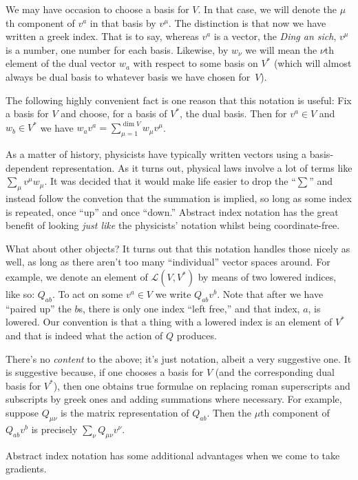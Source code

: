 \documentclass[10pt, a4paper]{article}
\begin{document}
We may have occasion to choose a basis for $V$. In that case, we will
denote the $\mu$th component of $v^a$ in that basis by $v^\mu$. The
distinction is that now we have written a greek index. That is to say,
whereas $v^a$ is a vector, the \emph{Ding an sich}, $v^\mu$ is a number,
one number for each basis. Likewise, by $w_\nu$ we will mean the
$\nu$th element of the dual vector $w_a$ with respect to some basis
on $V^*$ (which will almost always be dual basis to whatever basis we
have chosen for~$V$).

The following highly convenient fact is one reason that this notation
is useful: Fix a basis for $V$ and choose, for a basis of $V^*$, the
dual basis. Then for $v^a\in V$ and $w_b\in V^*$ we have
$w_av^a = \sum_{\mu=1}^{\dim V} w_\mu v^\mu$.

As a matter of history, physicists have typically written vectors
using a basis-dependent representation. As it turns out, physical laws
involve a lot of terms like $\sum_\mu v^\mu w_\mu$. It was decided that it
would make life easier to drop the “$\sum$” and instead follow the
convetion that the summation is implied, so long as some index is
repeated, once “up” and once “down.” Abstract index notation has the
great benefit of looking \emph{just like} the physicists' notation
whilst being coordinate-free.

What about other objects? It turns out that this notation handles
those nicely as well, as long as there aren't too many “individual”
vector spaces around. For example, we denote an element of
$\mathcal{L}(V,V^*)$ by means of two lowered indices, like so:
$Q_{ab}$. To act on some $v^a\in V$ we write $Q_{ab}v^b$. Note that
after we have “paired up” the $b$s, there is only one index “left
free,” and that index, $a$, is lowered. Our convention is that a thing
with a lowered index is an element of $V^*$ and that is indeed what
the action of $Q$ produces.

There's no \emph{content} to the above; it's just notation, albeit a
very suggestive one. It is suggestive because, if one chooses a basis
for $V$ (and the corresponding dual basis for $V^*$), then one obtains
true formulae on replacing roman superscripts and subscripts by greek
ones and adding summations where necessary. For example, suppose
$Q_{\mu\nu}$ is the matrix representation of $Q_{ab}$. Then the
$\mu$th component of $Q_{ab}v^b$ is precisely $\sum_\nu Q_{\mu\nu}v^\nu$.

Abstract index notation has some additional advantages when we come to
take gradients.
\end{document}
